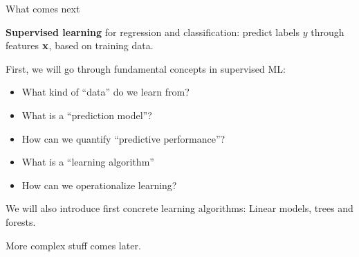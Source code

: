 \documentclass[11pt,compress,t,notes=noshow, xcolor=table]{beamer}
\begin{document}
\begin{framei}{What comes next}
\item \textbf{Supervised learning} for regression and classification: predict labels $y$ through features $\mathbf{x}$, based on training data.
\item First, we will go through fundamental concepts in supervised ML: 
\begin{itemize}
  \item What kind of ``data'' do we learn from?
  \item What is a ``prediction model''?
  \item How can we quantify ``predictive performance''?
  \item What is a ``learning algorithm'' 
  \item How can we operationalize learning?
\end{itemize}
\item We will also introduce first concrete learning algorithms: Linear models, trees and forests. 
\item More complex stuff comes later.
\end{framei}

\endlecture
\end{document}
